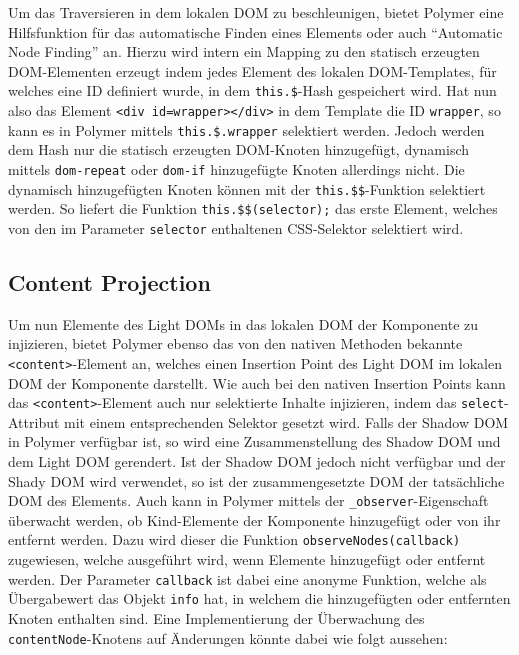Um das Traversieren in dem lokalen DOM zu beschleunigen, bietet Polymer eine Hilfsfunktion für das automatische Finden eines Elements oder auch ``Automatic Node Finding'' an. Hierzu wird intern ein Mapping zu den statisch erzeugten DOM-Elementen erzeugt indem jedes Element des lokalen DOM-Templates, für welches eine ID definiert wurde, in dem \texttt{this.\$}-Hash gespeichert wird. Hat nun also das Element \texttt{\textless{}div\ id=\dq wrapper\dq\textgreater{}\textless{}/div\textgreater{}} in dem Template die ID \texttt{wrapper}, so kann es in Polymer mittels \texttt{this.\$.wrapper} selektiert werden. Jedoch werden dem Hash nur die statisch erzeugten DOM-Knoten hinzugefügt, dynamisch mittels \texttt{dom-repeat} oder \texttt{dom-if} hinzugefügte Knoten allerdings nicht. Die dynamisch hinzugefügten Knoten können mit der \texttt{this.\$\$}-Funktion selektiert werden. So liefert die Funktion \texttt{this.\$\$(selector);} das erste Element, welches von den im Parameter \texttt{selector} enthaltenen CSS-Selektor selektiert wird.


\subsection{Content Projection}\label{content-projection}

Um nun Elemente des Light DOMs in das lokalen DOM der Komponente zu injizieren, bietet Polymer ebenso das von den nativen Methoden bekannte \texttt{\textless{}content\textgreater{}}-Element an, welches einen Insertion Point des Light DOM im lokalen DOM der Komponente darstellt. Wie auch bei den nativen Insertion Points kann das \texttt{\textless{}content\textgreater{}}-Element auch nur selektierte Inhalte injizieren, indem das \texttt{select}-Attribut mit einem entsprechenden Selektor gesetzt wird. Falls der Shadow DOM in Polymer verfügbar ist, so wird eine Zusammenstellung des Shadow DOM und dem Light DOM gerendert. Ist der Shadow DOM jedoch nicht verfügbar und der Shady DOM wird verwendet, so ist der zusammengesetzte DOM der tatsächliche DOM des Elements. Auch kann in Polymer mittels der \texttt{\_observer}-Eigenschaft überwacht werden, ob Kind-Elemente der Komponente hinzugefügt oder von ihr entfernt werden. Dazu wird dieser die Funktion \texttt{observeNodes(callback)} zugewiesen, welche ausgeführt wird, wenn Elemente hinzugefügt oder entfernt werden. Der Parameter \texttt{callback} ist dabei eine anonyme Funktion, welche als Übergabewert das Objekt \texttt{info} hat, in welchem die hinzugefügten oder entfernten Knoten enthalten sind. Eine Implementierung der Überwachung des \texttt{contentNode}-Knotens auf Änderungen könnte dabei wie folgt aussehen:

